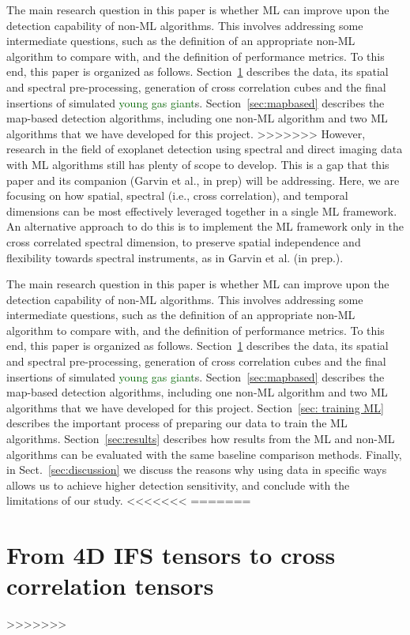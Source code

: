 \documentclass{aa}
\newcommand{\newchange}[1]{\textcolor{darkgreen}{#1}}
\begin{document}
{The main research question in this paper is whether ML can improve upon the detection capability of non-ML algorithms. This involves addressing some intermediate questions, such as the definition of an appropriate non-ML algorithm to compare with, and the definition of performance metrics.
To this end, this paper is organized as follows. Section~\ref{sec:data} describes the data, its spatial and spectral pre-processing, generation of cross correlation cubes and the final insertions of simulated \newchange{young gas giant}s.
Section~\ref{sec:mapbased} describes the map-based detection algorithms, including one non-ML algorithm and two ML algorithms that we have developed for this project.
>>>>>>>
However, research in the field of exoplanet detection using spectral and direct imaging data with ML algorithms still has plenty of scope to develop. This is a gap that this paper and its companion (Garvin et al., in prep) will be addressing.
Here, we are focusing on how spatial, spectral (i.e., cross correlation), and temporal dimensions can be most effectively leveraged together in a single ML framework. 
An alternative approach to do this is to implement the ML framework only in the cross correlated spectral dimension, to preserve spatial independence and flexibility towards spectral instruments, as in Garvin et al. (in prep.).

The main research question in this paper is whether ML can improve upon the detection capability of non-ML algorithms. This involves addressing some intermediate questions, such as the definition of an appropriate non-ML algorithm to compare with, and the definition of performance metrics.
To this end, this paper is organized as follows. Section~\ref{sec:data} describes the data, its spatial and spectral pre-processing, generation of cross correlation cubes and the final insertions of simulated \newchange{young gas giant}s.
Section~\ref{sec:mapbased} describes the map-based detection algorithms, including one non-ML algorithm and two ML algorithms that we have developed for this project.
Section~\ref{sec: training ML} describes the important process of preparing our data to train the ML algorithms.
Section~\ref{sec:results} describes how results from the ML and non-ML algorithms can be evaluated with the same baseline comparison methods.
Finally, in Sect.~\ref{sec:discussion} we discuss the reasons why using data in specific ways allows us to achieve higher detection sensitivity, and conclude with the limitations of our study.
<<<<<<<
=======
\section{From 4D IFS tensors to cross correlation tensors}\label{sec:data}
>>>>>>>


}
\end{document}
